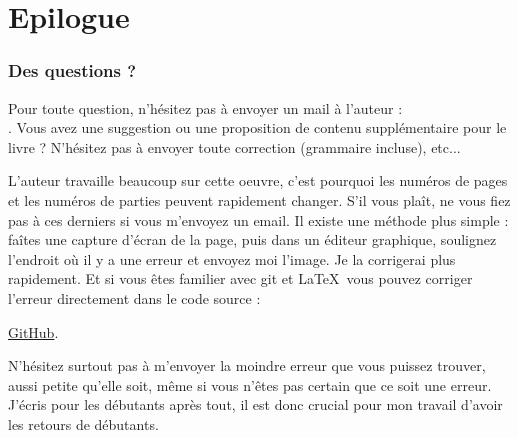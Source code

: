 \part*{Epilogue}

\section{Des questions ?}

Pour toute question, n'hésitez pas à envoyer un mail à l'auteur : \\
\GTT{<\EMAIL>}.
Vous avez une suggestion ou une proposition de contenu supplémentaire pour le livre ?
N'hésitez pas à envoyer toute correction (grammaire incluse), etc...

L'auteur travaille beaucoup sur cette oeuvre, c'est pourquoi les numéros de pages et les numéros de parties peuvent rapidement changer.
S'il vous plaît, ne vous fiez pas à ces derniers si vous m'envoyez un email. 
Il existe une méthode plus simple : faîtes une capture d'écran de la page, puis dans un éditeur graphique, soulignez l'endroit où il y a une erreur et envoyez moi l'image. Je la corrigerai plus rapidement.
Et si vous êtes familier avec git et \LaTeX\, vous pouvez corriger l'erreur directement dans le code source :

\href{http://go.yurichev.com/17089}{GitHub}.

N'hésitez surtout pas à m'envoyer la moindre erreur que vous puissez trouver, aussi petite qu'elle soit, même si vous n'êtes pas certain que ce soit une erreur.
J'écris pour les débutants après tout, il est donc crucial pour mon travail d'avoir les retours de débutants.

